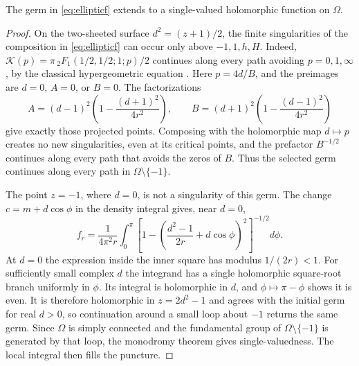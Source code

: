 \begin{lemma}\label{lem:directanalytic}
The germ in \eqref{eq:ellipticf} extends to a single-valued holomorphic
function on $\Omega$.
\end{lemma}
\begin{proof}
On the two-sheeted surface $d^2=(z+1)/2$, the finite singularities of the
composition in \eqref{eq:ellipticf} can occur only above
$-1,1,h,H$. Indeed, $\mathcal K(p)=\pi\,{}_2F_1(1/2,1/2;1;p)/2$
continues along every path avoiding $p=0,1,\infty$, by the classical
hypergeometric equation \cite[15.10.1]{DLMF}. Here $p=4d/B$, and the
preimages are $d=0$, $A=0$, or $B=0$. The factorizations
\begin{equation}\label{eq:ABfactor}
 A=(d-1)^2\left(1-\frac{(d+1)^2}{4r^2}\right),\qquad
 B=(d+1)^2\left(1-\frac{(d-1)^2}{4r^2}\right)
\end{equation}
give exactly those projected points. Composing with the holomorphic
map $d\mapsto p$ creates no new singularities, even at its critical
points, and the prefactor $B^{-1/2}$ continues along every path that
avoids the zeros of $B$. Thus the selected germ continues
along every path in $\Omega\setminus\{-1\}$.

The point $z=-1$, where $d=0$, is not a singularity of this germ. The change
$c=m+d\cos\phi$ in the density integral gives, near $d=0$,
\[
 f_r=\frac1{4\pi^2r}\int_0^\pi
 \left[1-\left(\frac{d^2-1}{2r}+d\cos\phi\right)^2\right]^{-1/2}d\phi.
\]
At $d=0$ the expression inside the inner square has modulus
$1/(2r)<1$. For sufficiently small complex $d$ the integrand has a
single holomorphic square-root branch uniformly in $\phi$. Its integral
is holomorphic in $d$, and $\phi\mapsto\pi-\phi$ shows it is even.
It is therefore holomorphic in $z=2d^2-1$ and agrees with the initial germ
for real $d>0$, so continuation around a small loop about $-1$ returns
the same germ.
Since $\Omega$ is simply connected and the fundamental group of
$\Omega\setminus\{-1\}$ is generated by that loop, the monodromy theorem
gives single-valuedness. The local integral then fills the puncture.
\end{proof}

